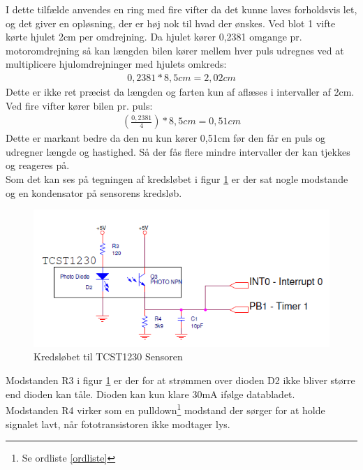 I dette tilfælde anvendes en ring med fire vifter da det kunne laves forholdsvis let, og det giver en opløsning, der er høj nok til hvad der ønskes. Ved blot 1 vifte kørte hjulet 2cm per omdrejning. Da hjulet kører 0,2381 omgange pr. motoromdrejning så kan længden bilen kører mellem hver puls udregnes ved at multiplicere hjulomdrejninger med hjulets omkreds:
\begin{align*}
0,2381*8,5cm = 2,02 cm
\end{align*}
Dette er ikke ret præcist da længden og farten kun af aflæses i intervaller af 2cm. Ved fire vifter kører bilen pr. puls:
\begin{align*}
(\frac{0,2381}{4})* 8,5cm = 0,51cm
\end{align*}
Dette er markant bedre da den nu kun kører 0,51cm før den får en puls og udregner længde og hastighed. Så der fås flere mindre intervaller der kan tjekkes og reageres på. \\ 

Som det kan ses på tegningen af kredsløbet i figur \ref{wheelspeedTegning} er der sat nogle modstande og en kondensator på sensorens kredsløb. \\

\begin{figure}[h!]
\center
\includegraphics[scale=0.75]{./Graphics/TCST1230}
\caption{Kredsløbet til TCST1230 Sensoren}
\label{wheelspeedTegning}
\end{figure}

Modstanden R3 i figur \ref{wheelspeedTegning} er der for at strømmen over dioden D2 ikke bliver større end dioden kan tåle. Dioden kan kun klare 30mA ifølge databladet. \\

Modstanden R4 virker som en pulldown\footnote{Se ordliste \ref{ordliste}} modstand der sørger for at holde signalet lavt, når fototransistoren ikke modtager lys. \\

